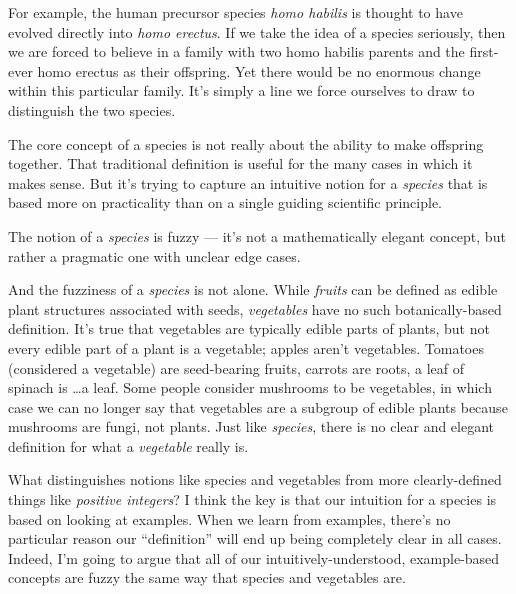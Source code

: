 \documentclass[11pt, oneside]{article}
\theoremstyle{argtstyle}
\begin{document}
\begin{itemize}
        For example, the human precursor species {\em homo habilis} is
        thought to have evolved directly into {\em homo erectus}.
        If we take the idea of a species seriously,
        then we are forced to believe in a family
        with two homo habilis parents and
        the first-ever homo erectus as their offspring.
        Yet there would be no enormous
        change within this particular family.
        It's simply a line we force
        ourselves to draw to distinguish the two species.
\end{itemize}

The core concept of a species is not really about the ability to make
offspring together.
That traditional definition is useful for the many cases in which it
makes sense.
But it's trying to capture an
intuitive notion for a {\em species} that is
based more on practicality than on a single guiding scientific principle.

The notion of a {\em species} is fuzzy --- it's not a mathematically elegant
concept, but rather a pragmatic one with unclear edge cases.

And the fuzziness of a {\em species} is not alone. While {\em fruits} can be
defined as edible plant structures associated with seeds,
{\em vegetables} have no such botanically-based definition.
It's true that vegetables are typically edible parts of plants,
but not every edible part of a plant is a vegetable;
apples aren't vegetables.
Tomatoes (considered a vegetable) are seed-bearing fruits, carrots are roots,
a leaf of spinach is \dots a leaf.
Some people consider mushrooms to be vegetables, in which
case we can no longer say that vegetables are a subgroup of edible plants
because mushrooms are fungi, not plants.
Just like {\em species}, there is no clear and elegant definition for what a
{\em vegetable} really is.

What distinguishes notions like species and vegetables from
more clearly-defined
things like
{\em positive integers}?
I think the key is that our intuition for a species is based on looking at
examples. When we learn from examples, there's no particular reason our
``definition'' will end up being completely clear in all cases.
Indeed, I'm going to argue that all of our
intuitively-understood, example-based concepts are fuzzy the same way that
species and vegetables are.
\end{document}
